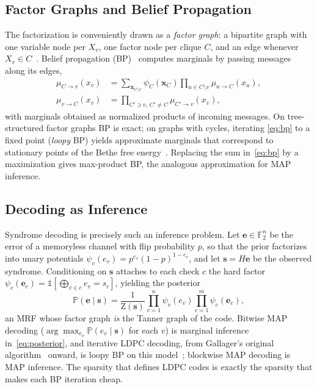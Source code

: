 \documentclass[a4paper,11pt]{quantumarticle}
\theoremstyle{definition}
\newcommand{\F}{\mathbb{F}}
\newcommand{\vx}{\boldsymbol{x}}
\newcommand{\ve}{\boldsymbol{e}}
\newcommand{\vs}{\boldsymbol{s}}
\newcommand{\Z}{\mathrm{Z}}
\newcommand{\PP}{\mathbb{P}}
\begin{document}
\subsection{Factor Graphs and Belief Propagation}
The factorization is conveniently drawn as a \emph{factor graph}: a
bipartite graph with one variable node per $X_v$, one factor node per clique
$C$, and an edge whenever $X_v\in C$~\cite{kschischang2001}. Belief
propagation (BP)~\cite{pearl1988} computes marginals by passing messages
along its edges,
\begin{align}
\mu_{C\to v}(x_v) &= \sum_{\vx_{C\setminus v}}\psi_C(\vx_C)
  \prod_{u\in C\setminus v}\mu_{u\to C}(x_u),
\label{eq:bp}\\
\mu_{v\to C}(x_v) &= \prod_{C'\ni v,\,C'\neq C}\mu_{C'\to v}(x_v),
\nonumber
\end{align}
with marginals obtained as normalized products of incoming messages. On
tree-structured factor graphs BP is exact; on graphs with cycles, iterating
\eqref{eq:bp} to a fixed point (\emph{loopy} BP) yields approximate
marginals that correspond to stationary points of the Bethe free
energy~\cite{yedidia2005}. Replacing the sum in~\eqref{eq:bp} by a
maximization gives max-product BP, the analogous approximation for MAP
inference.

\subsection{Decoding as Inference}
\label{sec:decinf}
Syndrome decoding is precisely such an inference problem. Let
$\ve\in\F_2^n$ be the error of a memoryless channel with flip
probability $p$, so that the prior factorizes into unary potentials
$\psi_v(e_v)=p^{e_v}(1-p)^{1-e_v}$, and let $\vs=H\ve$ be the observed
syndrome. Conditioning on $\vs$ attaches to each check $c$ the hard factor
$\psi_c(\ve_c)=\mathbb{1}[\bigoplus_{v\in c}e_v=s_c]$, yielding the
posterior
\begin{equation}
\PP(\ve\mid\vs)=\frac1{\Z(\vs)}\prod_{v=1}^{n}\psi_v(e_v)
\prod_{c=1}^{m}\psi_c(\ve_c),
\label{eq:posterior}
\end{equation}
an MRF whose factor graph \emph{is} the Tanner graph of the code. Bitwise
MAP decoding ($\arg\max_{e_v}\PP(e_v\mid\vs)$ for each $v$) is marginal
inference in~\eqref{eq:posterior}, and iterative LDPC decoding, from
Gallager's original algorithm~\cite{gallager1962} onward, is loopy BP on
this model~\cite{mceliece1998}; blockwise MAP decoding is MAP inference.
The sparsity that defines LDPC codes is exactly the sparsity that makes
each BP iteration cheap.
\end{document}
